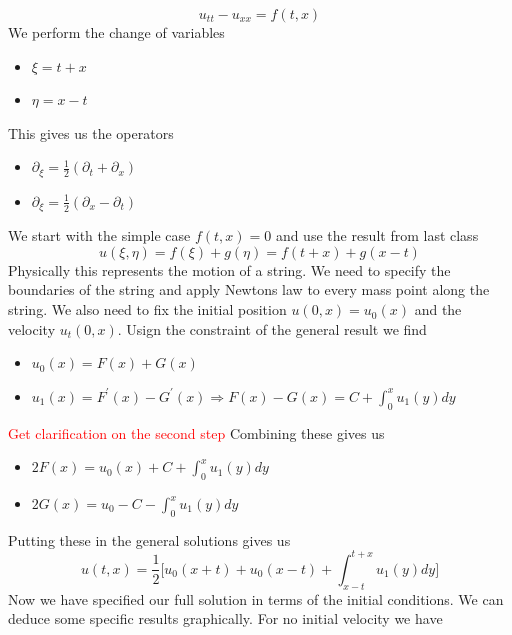 \documentclass[11pt,a4paper]{article}
\begin{document}
	$$
	u_{tt}-u_{xx} = f(t,x)
	$$	
	We perform the change of variables
\begin{itemize}
\item $\xi = t+x$
\item $\eta = x-t$
\end{itemize}
This gives us the operators
\begin{itemize}
\item $\partial_{\xi} = \frac{1}{2}(\partial_{t} + \partial_{x})$
\item $\partial_{\xi} = \frac{1}{2}(\partial_{x} - \partial_{t})$
\end{itemize}
We start with the simple case $f(t,x) = 0$ and use the result from last class
$$
u(\xi,\eta) = f(\xi)+g(\eta) = f(t+x) + g(x-t)
 $$
 Physically this represents the motion of a string. We need to specify the boundaries of the string and apply Newtons law to every mass point along the string. We also need to fix the initial position $u(0,x) = u_{0}(x)$ and the velocity $u_{t}(0,x)$.  Usign the constraint of the general result we find
 \begin{itemize}
 \item $u_{0}(x) = F(x) + G(x)$
 \item $u_{1}(x) = F^{\prime}(x)-G^{\prime}(x) \Rightarrow F(x) - G(x) = C + \int_{0}^{x}u_{1}(y)dy$
 \end{itemize}
\textcolor{red}{Get clarification on the second step} Combining these gives us
 \begin{itemize}
\item $2F(x) = u_{0}(x)+C+\int_{0}^{x}u_{1}(y)dy$
\item $2G(x)  = u_{0}- C - \int_{0}^{x}u_{1}(y)dy$
\end{itemize}
Putting these in the general solutions gives us
$$
u(t,x) = \frac{1}{2}\big[u_{0}(x+t)+u_{0}(x-t)+ \int_{x-t}^{t+x}u_{1}(y)dy\big]
$$
Now we have specified our full solution in terms of the initial conditions. We can deduce some specific results graphically. For no initial velocity we have
\end{document}
